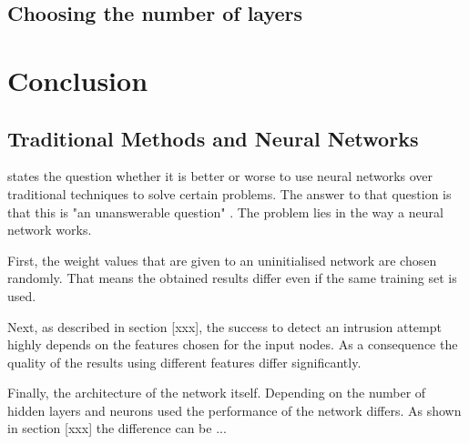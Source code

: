 \section{Choosing the number of layers}

\chapter{Conclusion}

\section{Traditional Methods and Neural Networks}

\cite{nn_vs_traditional} states the question whether it is better or worse to use neural networks over traditional techniques to solve certain problems. The answer to that question is that this is "an unanswerable question" \cite[p.4]{nn_vs_traditional}. The problem lies in the way a neural network works.

First, the weight values that are given to an uninitialised network are chosen randomly. That means the obtained results differ even if the same training set is used.

Next, as described in section [xxx], the success to detect an intrusion attempt  highly depends on the features chosen for the input nodes. As a consequence the quality of the results using different features differ significantly.

Finally, the architecture of the network itself. Depending on the number of hidden layers and neurons used the performance of the network differs. As shown in section [xxx] the difference can be ...
